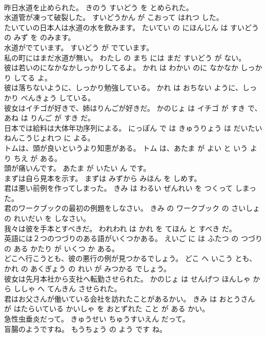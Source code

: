 \documentclass[8pt]{extreport}
\begin{document}
\begin{CJK}{UTF8}{min}
\\	昨日水道を止められた。	きのう すいどう を とめられた。	
\\	水道管が凍って破裂した。	すいどうかん が こおって はれつ した。	
\\	たいていの日本人は水道の水を飲みます。	たいてい の にほんじん は すいどう の みず を のみます。	
\\	水道がでています。	すいどう が でています。	
\\	私の町にはまだ水道が無い。	わたし の まち には まだ すいどう が ない。	
\\	彼は若いのになかなかしっかりしてるよ。	かれ は わかい のに なかなか しっかり してる よ。	
\\	彼は落ちないように、しっかり勉強している。	かれ は おちない ように、しっかり べんきょう している。	
\\	彼女はイチゴが好きで、姉はりんごが好きだ。	かのじょ は イチゴ が すき で、あね は りんご が すき だ。	
\\	日本では給料は大体年功序列による。	にっぽん で は きゅうりょう は だいたい ねんこうじょれつ に よる。	
\\	トムは、頭が良いというより知恵がある。	トム は、あたま が よい と いう より ちえ が ある。	
\\	頭が痛いんです。	あたま が いたい ん です。	
\\	まずは自ら見本を示す。	まずは みずから みほん を しめす。	
\\	君は悪い前例を作ってしまった。	きみ は わるい ぜんれい を つくって しまった。	
\\	君のワークブックの最初の例題をしなさい。	きみ の ワークブック の さいしょ の れいだい を しなさい。	
\\	我々は彼を手本とすべきだ。	われわれ は かれ を てほん と すべき だ。	
\\	英語には２つのつづりのある語がいくつかある。	えいご に は ふたつ の つづり の ある かたり が いくつ か ある。	
\\	どこへ行こうとも、彼の悪行の例が見つかるでしょう。	どこ へ いこう とも、かれ の あくぎょう の れい が みつかる でしょう。	
\\	彼女は先月本社から支社へ転勤させられた。	かのじょ は せんげつ ほんしゃ から ししゃ へ てんきん させられた。	
\\	君はお父さんが働いている会社を訪れたことがあるかい。	きみ は おとうさん が はたらいている かいしゃ を おとずれた こと が ある かい。	
\\	急性虫垂炎だって。	きゅうせい ちゅうすいえん だって。	
\\	盲腸のようですね。	もうちょう の よう です ね。	

\end{CJK}
\end{document}
